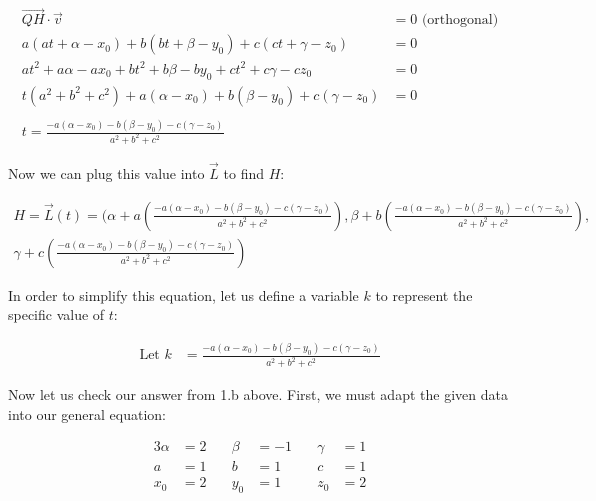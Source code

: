 \documentclass{article}
\begin{document}
\begin{align*}
\vec{QH} \cdot \vec{v} &= 0  \text{ (orthogonal)} \\
a(at + \alpha - x_0) + b(bt + \beta - y_0) + c(ct + \gamma - z_0) &= 0 \\
at^2 + a\alpha - ax_0 + bt^2 + b\beta - by_0 + ct^2 + c\gamma - cz_0 &= 0 \\
t(a^2 + b^2 + c^2) + a(\alpha - x_0) + b(\beta - y_0) + c(\gamma - z_0) &= 0 \\
\\
t = \frac{-a(\alpha - x_0) - b(\beta - y_0) - c(\gamma - z_0)}{a^2+b^2+c^2}
\end{align*}

\begin{text}
\indent Now we can plug this value into $\vec{L}$ to find $H$:
\end{text}

\begin{equation*}
\begin{multlined}
H = \vec{L}(t) = (\alpha + a(\frac{-a(\alpha - x_0) - b(\beta - y_0) - c(\gamma - z_0)}{a^2+b^2+c^2}), \beta + b(\frac{-a(\alpha - x_0) - b(\beta - y_0) - c(\gamma - z_0)}{a^2+b^2+c^2}), \\\gamma + c(\frac{-a(\alpha - x_0) - b(\beta - y_0) - c(\gamma - z_0)}{a^2+b^2+c^2})
\end{multlined}
\end{equation*}

\begin{text}
\indent In order to simplify this equation, let us define a variable $k$ to represent the specific value of $t$:
\end{text}

\begin{align*}
\text{Let } k &= \frac{-a(\alpha - x_0) - b(\beta - y_0) - c(\gamma - z_0)}{a^2+b^2+c^2}
\end{align*}

\begin{text}
\newline
\indent Now let us check our answer from 1.b above.  First, we must adapt the given data into our general equation:
\end{text}

\begin{alignat*}{3}
\alpha &= 2 \quad & \beta &= -1 \quad & \gamma &= 1 \\
a &= 1    \quad & b &= 1    \quad & c &= 1\\
x_0 &= 2    \quad & y_0 &= 1  \quad & z_0 &= 2
\end{alignat*}
\end{document}
